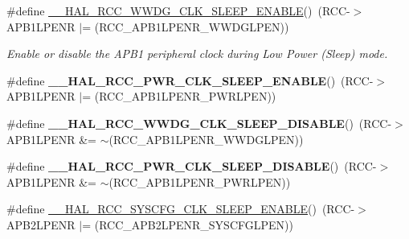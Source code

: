 \begin{DoxyCompactItemize}
\item 
\#define \mbox{\hyperlink{group___r_c_c___peripheral___clock___sleep___enable___disable_gaa3978a2e193b921dc24976880dce7a26}{\+\_\+\+\_\+\+H\+A\+L\+\_\+\+R\+C\+C\+\_\+\+W\+W\+D\+G\+\_\+\+C\+L\+K\+\_\+\+S\+L\+E\+E\+P\+\_\+\+E\+N\+A\+B\+LE}}()~(R\+CC-\/$>$A\+P\+B1\+L\+P\+E\+NR $\vert$= (R\+C\+C\+\_\+\+A\+P\+B1\+L\+P\+E\+N\+R\+\_\+\+W\+W\+D\+G\+L\+P\+EN))
\begin{DoxyCompactList}\small\item\em Enable or disable the A\+P\+B1 peripheral clock during Low Power (Sleep) mode. \end{DoxyCompactList}\item 
\mbox{\label{group___r_c_c___peripheral___clock___sleep___enable___disable_gacad9c9770ee2525fccf6a15e4ee7a07a}} 
\#define {\bfseries \+\_\+\+\_\+\+H\+A\+L\+\_\+\+R\+C\+C\+\_\+\+P\+W\+R\+\_\+\+C\+L\+K\+\_\+\+S\+L\+E\+E\+P\+\_\+\+E\+N\+A\+B\+LE}()~(R\+CC-\/$>$A\+P\+B1\+L\+P\+E\+NR $\vert$= (R\+C\+C\+\_\+\+A\+P\+B1\+L\+P\+E\+N\+R\+\_\+\+P\+W\+R\+L\+P\+EN))
\item 
\mbox{\label{group___r_c_c___peripheral___clock___sleep___enable___disable_gae61c24ac6b36e7edbabc5b050b38d63e}} 
\#define {\bfseries \+\_\+\+\_\+\+H\+A\+L\+\_\+\+R\+C\+C\+\_\+\+W\+W\+D\+G\+\_\+\+C\+L\+K\+\_\+\+S\+L\+E\+E\+P\+\_\+\+D\+I\+S\+A\+B\+LE}()~(R\+CC-\/$>$A\+P\+B1\+L\+P\+E\+NR \&= $\sim$(R\+C\+C\+\_\+\+A\+P\+B1\+L\+P\+E\+N\+R\+\_\+\+W\+W\+D\+G\+L\+P\+EN))
\item 
\mbox{\label{group___r_c_c___peripheral___clock___sleep___enable___disable_ga7b9889044ebfe2c9328d0f6733fda87d}} 
\#define {\bfseries \+\_\+\+\_\+\+H\+A\+L\+\_\+\+R\+C\+C\+\_\+\+P\+W\+R\+\_\+\+C\+L\+K\+\_\+\+S\+L\+E\+E\+P\+\_\+\+D\+I\+S\+A\+B\+LE}()~(R\+CC-\/$>$A\+P\+B1\+L\+P\+E\+NR \&= $\sim$(R\+C\+C\+\_\+\+A\+P\+B1\+L\+P\+E\+N\+R\+\_\+\+P\+W\+R\+L\+P\+EN))
\item 
\#define \mbox{\hyperlink{group___r_c_c___peripheral___clock___sleep___enable___disable_ga6e3a8ca9e554e3aa7aba57d034725655}{\+\_\+\+\_\+\+H\+A\+L\+\_\+\+R\+C\+C\+\_\+\+S\+Y\+S\+C\+F\+G\+\_\+\+C\+L\+K\+\_\+\+S\+L\+E\+E\+P\+\_\+\+E\+N\+A\+B\+LE}}()~(R\+CC-\/$>$A\+P\+B2\+L\+P\+E\+NR $\vert$= (R\+C\+C\+\_\+\+A\+P\+B2\+L\+P\+E\+N\+R\+\_\+\+S\+Y\+S\+C\+F\+G\+L\+P\+EN))

\end{DoxyCompactItemize}

